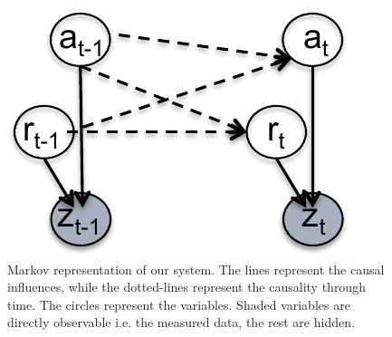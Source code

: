 \documentclass[10pt, conference, compsocconf]{IEEEtran}
\begin{document}
\begin{figure}
\begin{center}
\includegraphics[width=0.35\columnwidth]{graph-crop}
\end{center}
\caption{Markov representation of our system. The lines represent the causal influences, while the dotted-lines represent the causality through time. The circles represent the variables. Shaded variables are directly observable i.e. the measured data, the rest are hidden.}
\label{fig:graph}
\end{figure}
\end{document}
